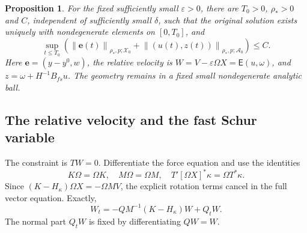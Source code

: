 \documentclass[11pt,a4paper]{article}
\numberwithin{equation}{section}
\newtheorem{proposition}[theorem]{Proposition}
\theoremstyle{remark}
\newcommand{\norm}[1]{\left\lVert #1\right\rVert}
\newcommand{\Graph}{\mathsf E}
\newcommand{\Xzero}{\mathcal X_0}
\newcommand{\Azero}{\mathcal A_0}
\begin{document}
\begin{proposition}\label{prop:interval}
For the fixed sufficiently small \(\varepsilon>0\), there are
\(T_0>0\), \(\rho_*>0\) and \(C\), independent of sufficiently small
\(\delta\), such that the original solution exists uniquely with
nondegenerate elements on \([0,T_0]\), and
\[
 \sup_{t\leq T_0}\left(
   \norm{\mathbf e(t)}_{\rho_*,p;\Xzero}
   +\norm{(u(t),z(t))}_{\rho_*,p;\Azero}\right)\leq C .
\]
Here \(\mathbf e=(y-y^0,w)\), the relative velocity is
\(W=V-\varepsilon\Omega X=\Graph(u,\omega)\), and
\(z=\omega+H^{-1}B_{fs}u\).
The geometry remains in a fixed small nondegenerate analytic ball.
\end{proposition}

\subsection{The relative velocity and the fast Schur variable}

The constraint is \(TW=0\). Differentiate the force equation and
use the identities
\[
 K\Omega=\Omega K,\quad M\Omega=\Omega M,\quad
 T'[\Omega X]^*\kappa=\Omega T^*\kappa .
\]
Since \((K-H_\kappa)\Omega X=-\Omega MV\), the explicit rotation
terms cancel in the full vector equation. Exactly,
\begin{equation}\label{eq:relative-equation}
 W_t=-QM^{-1}(K-H_\kappa)W+Q_tW .
\end{equation}
The normal part \(Q_tW\) is fixed by differentiating \(QW=W\).
\end{document}
